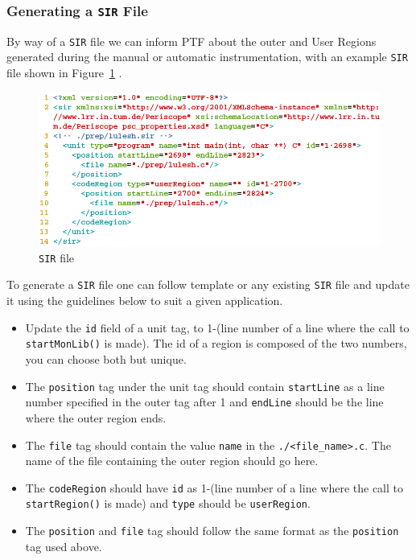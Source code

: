	\subsubsection{Generating a {\tt SIR} File}
	
By way of a {\tt SIR} file we can inform PTF about the outer and User Regions generated during the manual or automatic instrumentation, with an example {\tt SIR} file shown in Figure~\ref{fig:uc3_sir_file} .
	
	\begin{figure}[H]
		\centering
		\includegraphics[scale=.65]{../BPG/images/uc3_sir_file.png}
		\caption{{\tt SIR} file}
		\label{fig:uc3_sir_file}
	\end{figure}
	
To generate a {\tt SIR} file one can follow template or any existing {\tt SIR} file and update it using the guidelines below to suit a given application.

\begin{itemize}

\item Update the {\tt id} field of a unit tag, to 1-(line number of a line where the call to {\tt startMonLib()} is made). The id of a region is composed of the two numbers, you can choose both but unique.

\item The {\tt position} tag under the unit tag should contain {\tt startLine} as a line number specified in the outer tag after 1  and {\tt endLine} should be the line where the outer region ends.

\item The {\tt file} tag should contain the value {\tt name} in the {\tt ./\textless file\_name\textgreater.c}.  The name of the file containing the outer region should go here.

\item The {\tt codeRegion} should have {\tt id} as 1-(line number of a line where the call to {\tt startRegion()} is made) and {\tt type} should be {\tt userRegion}.

\item The {\tt position} and {\tt file} tag should follow the same format as the {\tt position} tag used above.
		
		
\end{itemize}	
	
